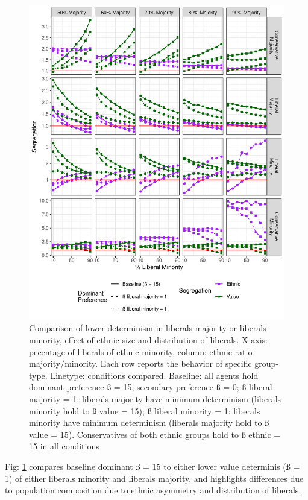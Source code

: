 \documentclass[
]{article}
\begin{document}
\begin{figure}[H]

{\centering \includegraphics{ev_rum_files/figure-latex/dislib_fig-1} 

}

\caption{Comparison of lower determinism in liberals majority or liberals minority, effect of ethnic size and distribution of liberals. X-axis: pecentage of liberals of ethnic minority, column: ethnic ratio majority/minority. Each row reports the behavior of specific group-type. Linetype: conditions compared. Baseline: all agents hold dominant preference ß = 15,  secondary preference ß = 0; ß liberal majority = 1: liberals majority have minimum determinism (liberals minority hold to ß value = 15); ß liberal minority = 1: liberals minority have minimum determinism (liberals majority hold to ß value = 15). Conservatives of both ethnic groups hold to ß ethnic = 15 in all conditions}\label{fig:dislib_fig}
\end{figure}

Fig: \ref{fig:dislib_fig} compares baseline dominant ß = 15 to either
lower value determinis (ß = 1) of either liberals minority and liberals
majority, and highlights differences due to population composition due
to ethnic asymmetry and distribution of liberals.
\end{document}
